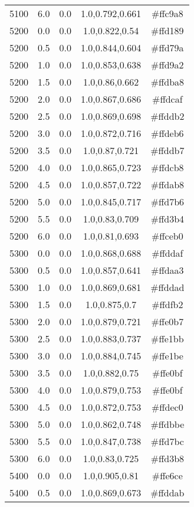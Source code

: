 \begin{tabular}{ccccc}
5100 & 6.0 & 0.0 & 1.0,0.792,0.661 & \#ffc9a8 \\ 
5200 & 0.0 & 0.0 & 1.0,0.822,0.54 & \#ffd189 \\ 
5200 & 0.5 & 0.0 & 1.0,0.844,0.604 & \#ffd79a \\ 
5200 & 1.0 & 0.0 & 1.0,0.853,0.638 & \#ffd9a2 \\ 
5200 & 1.5 & 0.0 & 1.0,0.86,0.662 & \#ffdba8 \\ 
5200 & 2.0 & 0.0 & 1.0,0.867,0.686 & \#ffdcaf \\ 
5200 & 2.5 & 0.0 & 1.0,0.869,0.698 & \#ffddb2 \\ 
5200 & 3.0 & 0.0 & 1.0,0.872,0.716 & \#ffdeb6 \\ 
5200 & 3.5 & 0.0 & 1.0,0.87,0.721 & \#ffddb7 \\ 
5200 & 4.0 & 0.0 & 1.0,0.865,0.723 & \#ffdcb8 \\ 
5200 & 4.5 & 0.0 & 1.0,0.857,0.722 & \#ffdab8 \\ 
5200 & 5.0 & 0.0 & 1.0,0.845,0.717 & \#ffd7b6 \\ 
5200 & 5.5 & 0.0 & 1.0,0.83,0.709 & \#ffd3b4 \\ 
5200 & 6.0 & 0.0 & 1.0,0.81,0.693 & \#ffceb0 \\ 
5300 & 0.0 & 0.0 & 1.0,0.868,0.688 & \#ffddaf \\ 
5300 & 0.5 & 0.0 & 1.0,0.857,0.641 & \#ffdaa3 \\ 
5300 & 1.0 & 0.0 & 1.0,0.869,0.681 & \#ffddad \\ 
5300 & 1.5 & 0.0 & 1.0,0.875,0.7 & \#ffdfb2 \\ 
5300 & 2.0 & 0.0 & 1.0,0.879,0.721 & \#ffe0b7 \\ 
5300 & 2.5 & 0.0 & 1.0,0.883,0.737 & \#ffe1bb \\ 
5300 & 3.0 & 0.0 & 1.0,0.884,0.745 & \#ffe1be \\ 
5300 & 3.5 & 0.0 & 1.0,0.882,0.75 & \#ffe0bf \\ 
5300 & 4.0 & 0.0 & 1.0,0.879,0.753 & \#ffe0bf \\ 
5300 & 4.5 & 0.0 & 1.0,0.872,0.753 & \#ffdec0 \\ 
5300 & 5.0 & 0.0 & 1.0,0.862,0.748 & \#ffdbbe \\ 
5300 & 5.5 & 0.0 & 1.0,0.847,0.738 & \#ffd7bc \\ 
5300 & 6.0 & 0.0 & 1.0,0.83,0.725 & \#ffd3b8 \\ 
5400 & 0.0 & 0.0 & 1.0,0.905,0.81 & \#ffe6ce \\ 
5400 & 0.5 & 0.0 & 1.0,0.869,0.673 & \#ffddab \\ 

\end{tabular}
